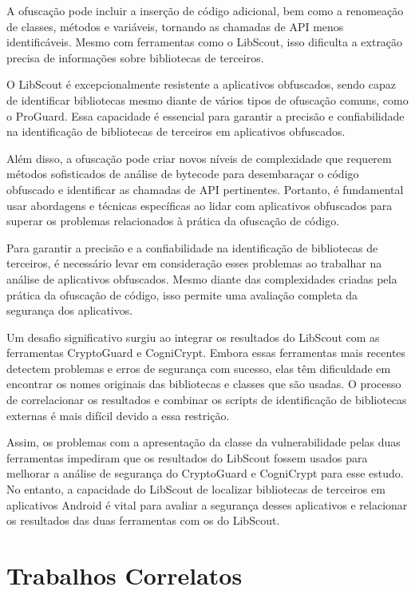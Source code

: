 A ofuscação pode incluir a inserção de código adicional, bem como a renomeação de classes, métodos e variáveis, tornando as chamadas de API menos identificáveis. Mesmo com ferramentas como o LibScout, isso dificulta a extração precisa de informações sobre bibliotecas de terceiros.

O LibScout é excepcionalmente resistente a aplicativos obfuscados, sendo capaz de identificar bibliotecas mesmo diante de vários tipos de ofuscação comuns, como o ProGuard. Essa capacidade é essencial para garantir a precisão e confiabilidade na identificação de bibliotecas de terceiros em aplicativos obfuscados.

Além disso, a ofuscação pode criar novos níveis de complexidade que requerem métodos sofisticados de análise de bytecode para desembaraçar o código obfuscado e identificar as chamadas de API pertinentes. Portanto, é fundamental usar abordagens e técnicas específicas ao lidar com aplicativos obfuscados para superar os problemas relacionados à prática da ofuscação de código.

Para garantir a precisão e a confiabilidade na identificação de bibliotecas de terceiros, é necessário levar em consideração esses problemas ao trabalhar na análise de aplicativos obfuscados. Mesmo diante das complexidades criadas pela prática da ofuscação de código, isso permite uma avaliação completa da segurança dos aplicativos.

Um desafio significativo surgiu ao integrar os resultados do LibScout com as ferramentas CryptoGuard e CogniCrypt. Embora essas ferramentas mais recentes detectem problemas e erros de segurança com sucesso, elas têm dificuldade em encontrar os nomes originais das bibliotecas e classes que são usadas. O processo de correlacionar os resultados e combinar os scripts de identificação de bibliotecas externas é mais difícil devido a essa restrição.

Assim, os problemas com a apresentação da classe da vulnerabilidade pelas duas ferramentas impediram que os resultados do LibScout fossem usados para melhorar a análise de segurança do CryptoGuard e CogniCrypt para esse estudo. No entanto, a capacidade do LibScout de localizar bibliotecas de terceiros em aplicativos Android é vital para avaliar a segurança desses aplicativos e relacionar os resultados das duas ferramentas com os do LibScout.


\section{Trabalhos Correlatos}

